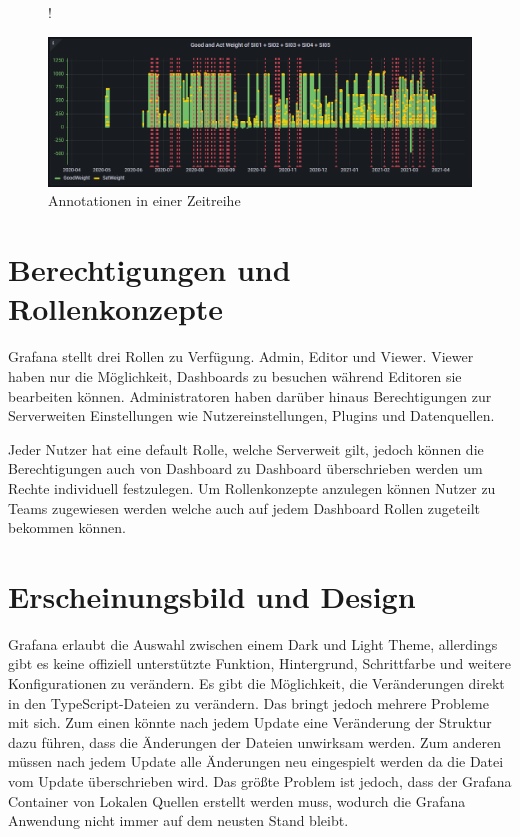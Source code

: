 \documentclass[a4paper, 12pt, oneside]{scrbook}
\begin{document}
	\begin{figure} [H]
	 	\centering
	 	\resizebox{\linewidth} {!} {
	 		\includegraphics{res/annotaitons.png}
	 		
	 	}
	 	\caption{Annotationen in einer Zeitreihe}
	 	\label{fig:annotations}
	 \end{figure}
	 
	 \section{Berechtigungen und Rollenkonzepte} \label{Gruppen}
	 
	 \noindent Grafana stellt drei Rollen zu Verfügung. Admin, Editor und Viewer. Viewer haben nur die Möglichkeit, Dashboards zu besuchen während Editoren sie bearbeiten können. Administratoren haben darüber hinaus Berechtigungen zur Serverweiten Einstellungen wie Nutzereinstellungen, Plugins und Datenquellen. 
	 	
	\noindent Jeder Nutzer hat eine default Rolle, welche Serverweit gilt, jedoch können die Berechtigungen auch von Dashboard zu Dashboard überschrieben werden um Rechte individuell festzulegen. Um Rollenkonzepte anzulegen können Nutzer zu Teams zugewiesen werden welche auch auf jedem Dashboard Rollen zugeteilt bekommen können. 
	 	
	\section{Erscheinungsbild und Design} \label{Design}
	 
	\noindent Grafana erlaubt die Auswahl zwischen einem Dark und Light Theme, allerdings gibt es keine offiziell unterstützte Funktion, Hintergrund, Schrittfarbe und weitere Konfigurationen zu verändern. Es gibt die Möglichkeit, die Veränderungen direkt in den TypeScript-Dateien zu verändern. Das bringt jedoch mehrere Probleme mit sich. Zum einen könnte nach jedem Update eine Veränderung der Struktur dazu führen, dass die Änderungen der Dateien unwirksam werden. Zum anderen müssen nach jedem Update alle Änderungen neu eingespielt werden da die Datei vom Update überschrieben wird. Das größte Problem ist jedoch, dass der Grafana Container von Lokalen Quellen erstellt werden muss, wodurch die Grafana Anwendung nicht immer auf dem neusten Stand bleibt.
	
\end{document}
